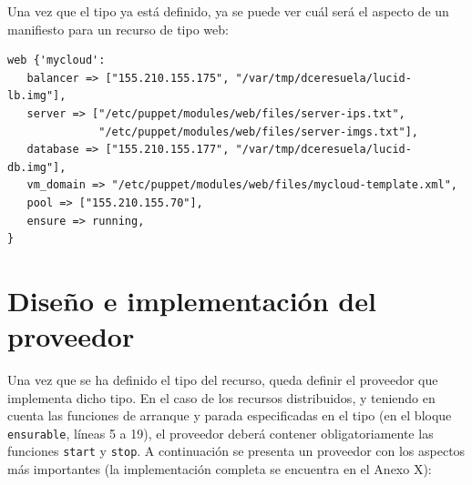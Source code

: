 Una vez que el tipo ya está definido, ya se puede ver cuál será el aspecto de un manifiesto para un recurso de tipo web:

\begin{lstlisting}
web {'mycloud':
   balancer => ["155.210.155.175", "/var/tmp/dceresuela/lucid-lb.img"],
   server => ["/etc/puppet/modules/web/files/server-ips.txt",
              "/etc/puppet/modules/web/files/server-imgs.txt"],
   database => ["155.210.155.177", "/var/tmp/dceresuela/lucid-db.img"],
   vm_domain => "/etc/puppet/modules/web/files/mycloud-template.xml",
   pool => ["155.210.155.70"],
   ensure => running,
}
\end{lstlisting}

\section{Diseño e implementación del proveedor}

Una vez que se ha definido el tipo del recurso, queda definir el proveedor que implementa dicho tipo. En el caso de los recursos distribuidos, y teniendo en cuenta las funciones de arranque y parada especificadas en el tipo (en el bloque \texttt{ensurable}, líneas 5 a 19), el proveedor deberá contener obligatoriamente las funciones \texttt{start} y \texttt{stop}. A continuación se presenta un proveedor con los aspectos más importantes (la implementación completa se encuentra en el Anexo X):

